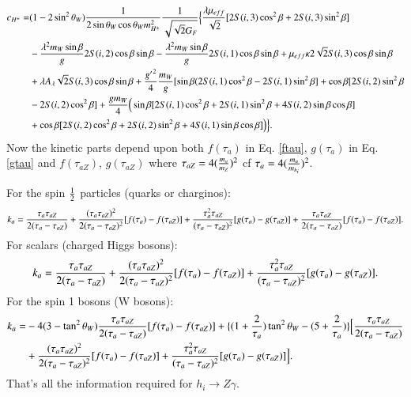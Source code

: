 \documentclass[final,3p,times,pdflatex]{elsarticle}
\begin{document}
\begin{equation}
\begin{aligned}
c_{H^{\pm}} = & (1 - 2\sin^2 \theta_W){1 \over 2 \sin\theta_W \cos\theta_W  m_{H^{\pm}}^2} {1 \over \sqrt{\sqrt{2} G_{F}}} \Big\{ {\lambda \mu_{eff} \over \sqrt{2}}[2S(i,3)\cos^2 \beta + 2 S(i,3) \sin^2 \beta] \\ & - {\lambda^2 m_{W} \sin\beta \over g}2S(i,2)\cos\beta \sin\beta - {\lambda^2 m_{W} \sin\beta \over g} 2S(i,1)\cos\beta\sin\beta + \mu_{eff}\kappa 2 \sqrt{2} S(i,3)\cos\beta\sin\beta \\ & + \lambda A_{\lambda} \sqrt{2} S(i,3)\cos\beta \sin\beta + {{g'}^2 \over 4}{m_{W} \over g}[\sin\beta(2S(i,1)\cos^2 \beta - 2S(i,1) \sin^2 \beta] + \cos\beta[2S(i,2)\sin^2 \beta \\ & - 2 S(i,2) \cos^2 \beta] + {g m_{W} \over 4} \Big(\sin\beta [2S(i,1)\cos^2 \beta + 2S(i,1)\sin^2 \beta + 4S(i,2)\sin\beta \cos\beta] \\ & + \cos\beta[2S(i,2)\cos^2 \beta + 2S(i,2) \sin^2 \beta + 4S(i,1)\sin\beta \cos\beta]\Big) \Big\}.
\end{aligned}
\end{equation}
Now the kinetic parts depend upon both $f({\tau_{a}})$ in Eq. \eqref{ftau}, $g({\tau_{a}})$ in Eq. \eqref{gtau} and $f({\tau_{aZ}})$, $g({\tau_{aZ}})$ where $\tau_{aZ} = 4({m_{a} \over m_{Z}})^2$ cf $\tau_{a} = 4({m_{a} \over m_{h_i}})^2$.

For the spin ${1 \over 2}$ particles (quarks or charginos):
\begin{equation}
k_{a} =  {\tau_{a} \tau_{aZ} \over 2(\tau_{a} - \tau_{aZ})} +  {(\tau_{a} \tau_{aZ})^2 \over 2(\tau_{a} - \tau_{aZ})^2 } [f({\tau_{a}}) - f({\tau_{aZ}})] +  {\tau_{a}^2 \tau_{aZ} \over (\tau_{a} - \tau_{aZ})^2}[g({\tau_{a}}) - g({\tau_{aZ}})] +  {\tau_{a} \tau_{aZ} \over 2(\tau_{a} - \tau_{aZ})}[f({\tau_{a}}) - f({\tau_{aZ}})].
\end{equation}
For scalars (charged Higgs bosons):
\begin{equation}
k_{a} = {\tau_{a} \tau_{aZ}  \over 2 ({\tau_{a}} - {\tau_{aZ}})} + {(\tau_{a} \tau_{aZ})^2 \over 2(\tau_{a} - \tau_{aZ})^2}[f({\tau_{a}})-f({\tau_{aZ}})] + {\tau_{a}^2 \tau_{aZ} \over (\tau_{a} - \tau_{aZ})^2}[g({\tau_{a}}) - g({\tau_{aZ}})].
\end{equation}
For the spin 1 bosons (W bosons):
\begin{equation}
\begin{aligned}
k_{a} = & -4(3-\tan^2 \theta_W){\tau_{a}\tau_{aZ} \over 2 (\tau_{a} - \tau_{aZ})}[f({\tau_{a}}) - f({\tau_{aZ}})] + \{(1 + {2 \over \tau_{a}})\tan^2 \theta_W - (5 + {2 \over \tau_{a}})\}\Big[{\tau_{a} \tau_{aZ} \over 2(\tau_{a} - \tau_{aZ})} \\ & + {(\tau_{a} \tau_{aZ})^2 \over 2 (\tau_{a}-\tau_{aZ})^2}[f({\tau_{a}}) - f({\tau_{aZ}})] + {\tau_{a}^2 \tau_{aZ} \over (\tau_{a} - \tau_{aZ})^2}[g({\tau_{a}}) - g({\tau_{aZ}})]\Big]. 	
\end{aligned}	
\end{equation}
That's all the information required for $h_{i} \rightarrow Z \gamma$.
\end{document}
